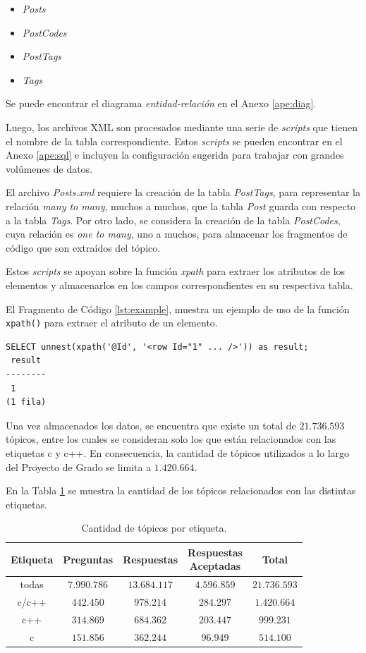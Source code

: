 \begin{itemize}
  \item \textit{Posts}
  \item \textit{PostCodes}
  \item \textit{PostTags}
  \item \textit{Tags}
\end{itemize}

Se puede encontrar el diagrama \textit{entidad-relación} en el Anexo \ref{ape:diag}.

Luego, los archivos \ac{XML} son procesados
mediante una serie de \textit{scripts} que 
tienen el nombre de la tabla correspondiente.
Estos \textit{scripts} se pueden encontrar en el Anexo \ref{ape:sql}
e incluyen la configuración sugerida para trabajar con
grandes volúmenes de datos.

El archivo \textit{Posts.xml} requiere la creación de la tabla \textit{PostTags},
para representar la relación \textit{many to many}, muchos a muchos,
que la tabla \textit{Post} guarda con respecto a la tabla \textit{Tags}.
Por otro lado, se considera la creación de la tabla \textit{PostCodes},
cuya relación es \textit{one to many}, uno a muchos,
para almacenar los fragmentos de código que son extraídos del tópico.

Estos \textit{scripts} se apoyan sobre la función \textit{xpath}
para extraer los atributos de los elementos y almacenarlos en los campos
correspondientes en su respectiva tabla.

El Fragmento de Código \ref{lst:example}, muestra un ejemplo de uso de la función
\lstinline{xpath()} para extraer el atributo de un elemento.

\begin{lstlisting}[caption={Función xpath.},label={lst:example}]
SELECT unnest(xpath('@Id', '<row Id="1" ... />')) as result;
 result
--------
 1
(1 fila)
\end{lstlisting}

Una vez almacenados los datos, se encuentra que existe un total de $21.736.593$ tópicos,
entre los cuales se consideran solo los que están relacionados con las etiquetas c y c++.
En consecuencia, la cantidad de tópicos utilizados a lo largo del Proyecto de Grado se limita a $1.420.664$.

En la Tabla \ref{tab:topicos} se muestra la cantidad de los tópicos relacionados con las distintas etiquetas.
\begin{table}[h]
\caption{Cantidad de tópicos por etiqueta.}
\label{tab:topicos}
\centering
\begin{tabular}{ccccc}
\hline
{Etiqueta} & {Preguntas} & {Respuestas} & \makecell{Respuestas\\Aceptadas} & {Total} \\
\hline
{todas} & $7.990.786$ & $13.684.117$ & $4.596.859$ & $21.736.593$ \\ 
{c/c++} & $442.450$ & $978.214$ & $284.297$ & $1.420.664$ \\ 
{c++} & $314.869$ & $684.362$ & $203.447$ & $999.231$ \\ 
{c} & $151.856$ & $362.244$ & $96.949$ & $514.100$ \\
\hline
\end{tabular}
\end{table}

